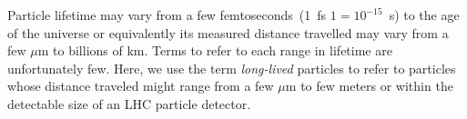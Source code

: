 {%
Particle lifetime may vary from a few femtoseconds~(1~fs $1 = 10^{-15}$~s) to the age of the universe or equivalently 
its measured distance travelled  may vary from a few $\mu$m to billions of km. 
Terms to refer to each range in lifetime are unfortunately few.
Here, we use the term \textit{long-lived} particles to refer to particles whose distance traveled
might range from a few $\mu$m to few meters or  within the detectable size of an LHC particle detector.


}
